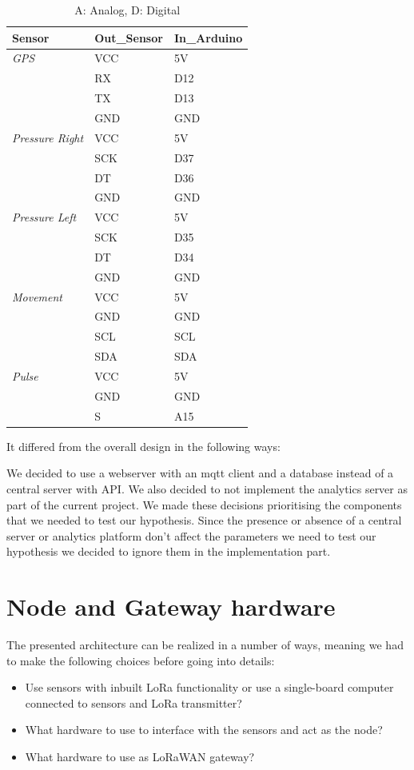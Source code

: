 \begin{table}[h]
	\begin{tabular}{l|ll}
		\textbf{Sensor} & \textbf{Out\_Sensor} & \textbf{In\_Arduino} \\\hline
		\textit{GPS} & VCC & 5V \\
		& RX & D12 \\
		& TX & D13 \\
		& GND & GND \\\hline
		\textit{Pressure Right} & VCC & 5V \\
		& SCK & D37 \\
		& DT & D36 \\
		& GND & GND \\\hline
		\textit{Pressure Left} & VCC & 5V \\
		& SCK & D35 \\
		& DT & D34 \\
		& GND & GND \\\hline
		\textit{Movement} & VCC & 5V \\
		& GND & GND \\
		& SCL & SCL \\
		& SDA & SDA \\\hline
		\textit{Pulse} & VCC & 5V \\
		& GND & GND \\
		& S & A15 
	\end{tabular}
	\caption[Blueprint connections node]{A: Analog, D: Digital}
\end{table}

It differed from the overall design in the following ways:

We decided to use a webserver with an mqtt client and a database instead of a central server with API. We also decided to not implement the analytics server as part of the current project. We made these decisions prioritising the components that we needed to test our hypothesis. Since the presence or absence of a central server or analytics platform don't affect the parameters we need to test our hypothesis we decided to ignore them in the implementation part.


\section{Node and Gateway hardware}
	The presented architecture can be realized in a number of ways, meaning we had to make the following choices before going into details:

	\begin{itemize}
		\item Use sensors with inbuilt LoRa functionality or use a single-board computer connected to sensors and LoRa transmitter?
		\item What hardware to use to interface with the sensors and act as the node?
		\item What hardware to use as LoRaWAN gateway?
	\end{itemize}


